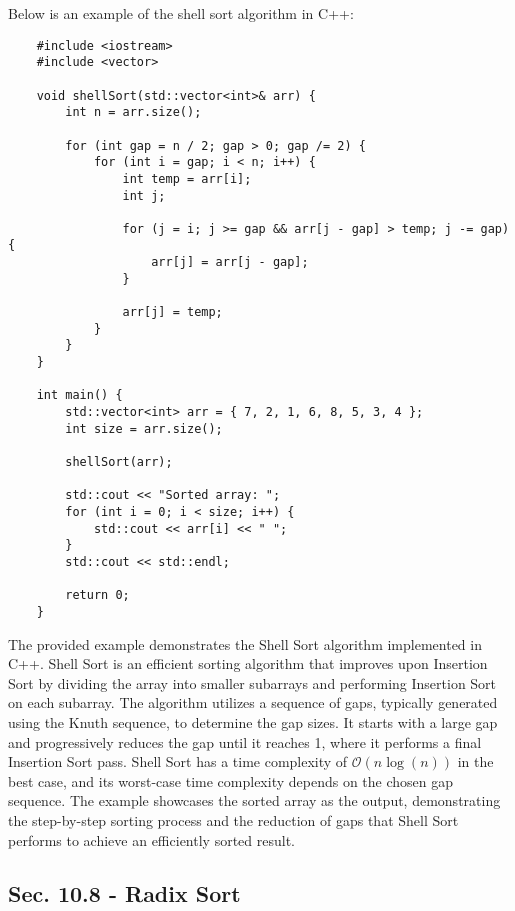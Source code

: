 \begin{solution}
    Below is an example of the shell sort algorithm in C++:

    \horizontalline

    \begin{verbatim}
    #include <iostream>
    #include <vector>
    
    void shellSort(std::vector<int>& arr) {
        int n = arr.size();
    
        for (int gap = n / 2; gap > 0; gap /= 2) {
            for (int i = gap; i < n; i++) {
                int temp = arr[i];
                int j;
    
                for (j = i; j >= gap && arr[j - gap] > temp; j -= gap) {
                    arr[j] = arr[j - gap];
                }
    
                arr[j] = temp;
            }
        }
    }
    
    int main() {
        std::vector<int> arr = { 7, 2, 1, 6, 8, 5, 3, 4 };
        int size = arr.size();
    
        shellSort(arr);
    
        std::cout << "Sorted array: ";
        for (int i = 0; i < size; i++) {
            std::cout << arr[i] << " ";
        }
        std::cout << std::endl;
    
        return 0;
    }
    \end{verbatim}

    \horizontalline

    The provided example demonstrates the Shell Sort algorithm implemented in C++. Shell Sort is an efficient sorting algorithm that improves upon Insertion Sort by dividing the array into smaller subarrays and performing Insertion Sort on each subarray. The algorithm utilizes a sequence of gaps, typically generated using the Knuth sequence,
    to determine the gap sizes. It starts with a large gap and progressively reduces the gap until it reaches 1, where it performs a final Insertion Sort pass. Shell Sort has a time complexity of $\mathcal{O}(n\log{(n)})$ in the best case, and its worst-case time complexity depends on the chosen gap sequence. The example showcases the sorted
    array as the output, demonstrating the step-by-step sorting process and the reduction of gaps that Shell Sort performs to achieve an efficiently sorted result.
\end{solution}

\subsection*{Sec. 10.8 - Radix Sort}

